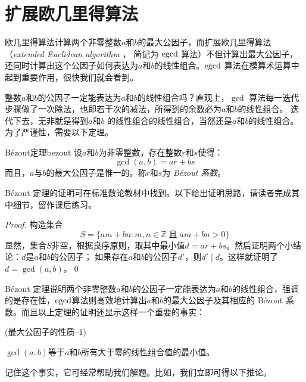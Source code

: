 \section{扩展欧几里得算法}
\label{sec:egcd}

欧几里得算法计算两个非零整数$a$和$b$的最大公因子，而扩展欧几里得算法（\emph{extended Euclidean algorithm} ，
简记为 $\operatorname{egcd}$ 算法）不但计算出最大公因子，还同时计算出这个公因子如何表达为$a$和$b$的线性组合。$\operatorname{egcd}$ 算法在模算术运算中起到重要作用，很快我们就会看到。

整数$a$和$b$的公因子一定能表达为$a$和$b$的线性组合吗？直观上，$\gcd$ 算法每一迭代步骤做了一次除法，也即若干次的减法，所得到的余数必为$a$和$b$的线性组合。
迭代下去，无非就是得到$a$和$b$
的线性组合的线性组合，当然还是$a$和$b$的线性组合。为了严谨性，需要以下定理。

\begin{theorem}{B\'{e}zout定理}{bezout}
	设$a$和$b$为非零整数，存在整数$r$和$s$使得：
	\[\gcd(a,b) = ar + bs\]
	而且，$a$与$b$的最大公因子是惟一的。称$r$和$s$为 \emph{B\'{e}zout 系数}。
\end{theorem}
B\'{e}zout 定理的证明可在标准数论教材中找到。以下给出证明思路，请读者完成其中细节，留作课后练习。
\begin{proof}
构造集合
	 \[S = \{ am + bn : m,n  \in \mathbb{Z} \; \text{且}\; am + bn > 0 \}\]
显然，集合$S$非空，根据良序原则，取其中最小值$d = ar + bs$。然后证明两个小结论：$d$是$a$和$b$的公因子；
如果存在$a$和$b$的公因子$d'$，则$d' \mid d$。这样就证明了$d= \gcd(a,b)$。\qed
\end{proof}

B\'{e}zout 定理说明两个非零整数$a$和$b$的公因子一定能表达为$a$和$b$的线性组合，强调的是存在性，$\operatorname{egcd}$算法则高效地计算出$a$和$b$的最大公因子及其相应的 B\'{e}zout 系数。而且以上定理的证明还显示这样一个重要的事实：
\begin{property}{(最大公因子的性质--1)}
\label{prop:gcd1}
\begin{center}
	\begin{tcolorbox}[colback=green!5!white, colframe=red!75!black,width = 11cm]
$\gcd(a,b)$等于$a$和$b$所有大于零的线性组合值的最小值。
	\end{tcolorbox}
	\end{center}
\end{property}
	
记住这个事实，它可经常帮助我们解题。比如，我们立即可得以下推论。

